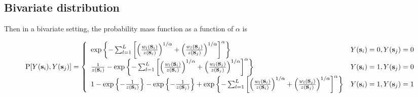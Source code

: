 \documentclass[11pt]{article}
\begin{document}
\subsection{Bivariate distribution}\label{s:bivariate}
Then in a bivariate setting, the probability mass function as a function of $\alpha$ is
\begin{adjustwidth}{-0.25in}{}
{\footnotesize
\begin{align} \label{biv}
  \text{P}[Y(\mbox{\bf s}_i), Y(\mbox{\bf s}_j)] = \left\{ \begin{array}{ll}
    \exp \left\{ - \sum_{ l = 1 }^{ L } \left[ \left( \frac{ w_{ l }(\mbox{\bf s}_i) }{ z(\mbox{\bf s}_i) } \right)^{1/\alpha} + \left( \frac{ w_{l }(\mbox{\bf s}_j)}{z(\mbox{\bf s}_j)} \right)^{1/\alpha} \right]^{\alpha} \right\} &Y(\mbox{\bf s}_i) = 0, Y(\mbox{\bf s}_j) = 0\\
    \frac{ 1 }{z(\mbox{\bf s}_i)} - \exp \left\{ - \sum_{ l = 1 }^{ L } \left[ \left( \frac{ w_{ l }(\mbox{\bf s}_i) }{ z(\mbox{\bf s}_i) } \right)^{1/\alpha} + \left( \frac{ w_{l }(\mbox{\bf s}_j)}{z(\mbox{\bf s}_j)} \right)^{1/\alpha} \right]^{\alpha} \right\} &Y(\mbox{\bf s}_i) = 1, Y(\mbox{\bf s}_j) = 0 \\
    1 - \exp\left\{ - \frac{ 1 }{ z(\mbox{\bf s}_i) } \right\} - \exp \left\{ - \frac{ 1 }{z(\mbox{\bf s}_j)} \right\} + \exp \left\{ - \sum_{ l = 1 }^{ L } \left[ \left( \frac{ w_{ l }(\mbox{\bf s}_i) }{ z(\mbox{\bf s}_i) } \right)^{1/\alpha} + \left( \frac{ w_{l }(\mbox{\bf s}_j)}{z(\mbox{\bf s}_j)} \right)^{1/\alpha} \right]^{\alpha} \right\} &Y(\mbox{\bf s}_i) = 1, Y(\mbox{\bf s}_j) = 1
  \end{array} \right.
\end{align}
}
\end{adjustwidth}
\end{document}
